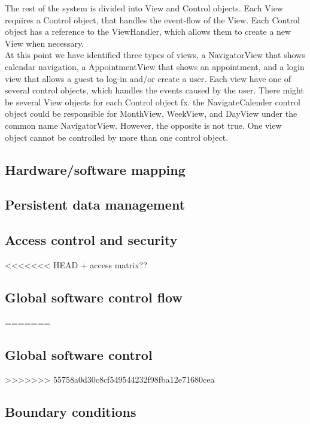 The rest of the system is divided into View and Control objects. Each View requires a Control object, that handles the event-flow of the View. Each Control object has a reference to the ViewHandler, which allows them to create a new View when necessary. \\

At this point we have identified three types of views, a NavigatorView that shows calendar navigation, a AppointmentView that shows an appointment, and a login view that allows a guest to log-in and/or create a user. Each view have one of several control objects, which handles the events caused by the user. There might be several View objects for each Control object fx. the NavigateCalender control object could be responsible for MonthView, WeekView, and DayView under the common name NavigatorView. However, the opposite is not true. One view object cannot be controlled by more than one control object. 

\subsection{Hardware/software mapping}


\subsection{Persistent data management}


\subsection{Access control and security}


<<<<<<< HEAD
+ access matrix??
 
\subsection{Global software control flow}
=======
\subsection{Global software control}
>>>>>>> 55758a0d30c8cf549544232f98fba12e71680cea


\subsection{Boundary conditions}

